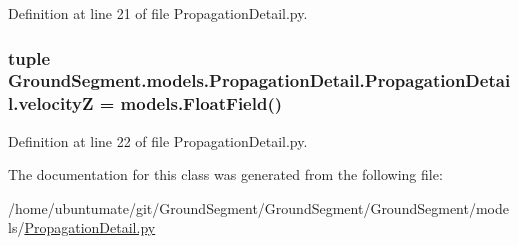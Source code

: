 Definition at line 21 of file Propagation\+Detail.\+py.

\hypertarget{class_ground_segment_1_1models_1_1_propagation_detail_1_1_propagation_detail_ac562c9a45f93f8f9d46f7aa89adaf569}{}
\subsubsection[{velocity\+Z}]{\setlength{\rightskip}{0pt plus 5cm}tuple Ground\+Segment.\+models.\+Propagation\+Detail.\+Propagation\+Detail.\+velocity\+Z = models.\+Float\+Field()\hspace{0.3cm}{\ttfamily [static]}}\label{class_ground_segment_1_1models_1_1_propagation_detail_1_1_propagation_detail_ac562c9a45f93f8f9d46f7aa89adaf569}


Definition at line 22 of file Propagation\+Detail.\+py.



The documentation for this class was generated from the following file\+:\begin{DoxyCompactItemize}
\item 
/home/ubuntumate/git/\+Ground\+Segment/\+Ground\+Segment/\+Ground\+Segment/models/\hyperlink{_propagation_detail_8py}{Propagation\+Detail.\+py}\end{DoxyCompactItemize}
